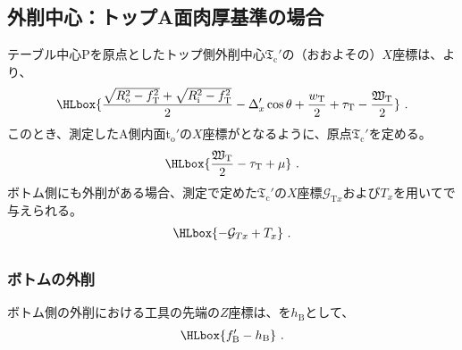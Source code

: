\subsection{外削中心：トップA面肉厚基準の場合}
テーブル中心Pを原点としたトップ側外削中心$\mathfrak T_\mathrm c'$の（おおよその）$X$座標は、より、
\begin{align*}
  \HLbox{%
    \frac{\sqrt{R_\mathrm o^2-f_\mathrm T^2}+\sqrt{R_\mathrm i^2-f_\mathrm T^2}}2
    -\Delta_x'\cos\theta
    +\frac{w_\mathrm T}2
    +\tau_\mathrm T
    -\frac{\mathfrak W_\mathrm T}2
  }\ .
\end{align*}
このとき、測定したA側内面t$_\mathrm o'$の$X$座標がとなるように、原点$\mathfrak T_\mathrm c'$を定める。
\begin{align*}
  \HLbox{\frac{\mathfrak W_\mathrm T}2-\tau_\mathrm T+\mu}~.
\end{align*}
ボトム側にも外削がある場合、測定で定めた$\mathfrak T_\mathrm c'$の$X$座標$\mathcal G_{\mathrm Tx}$および\CenterlineEndFaceDifAC$T_x$を用いてで与えられる。
\begin{align*}
  \HLbox{-\mathcal G_{Tx}+T_x}\ .
\end{align*}


\subsection{\OutcutLength}

\subsubsection{ボトムの外削}
ボトム側の外削における工具の先端の$Z$座標は、\BottomOutcutLength を$h_\mathrm B$として、
\begin{align*}
  \HLbox{f_\mathrm B'-h_\mathrm B}\ .
\end{align*}

